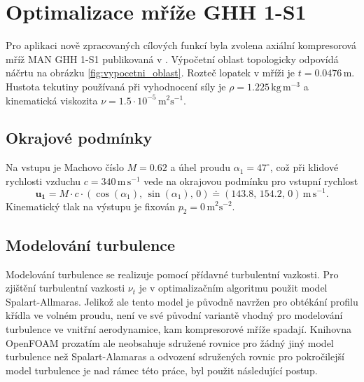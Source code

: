 \section{Optimalizace mříže GHH 1-S1}
Pro aplikaci nově zpracovaných cílových funkcí byla zvolena axiální kompresorová mříž MAN GHH 1-S1 publikovaná v \cite{steinert1990design}.
Výpočetní oblast topologicky odpovídá náčrtu na obrázku \ref{fig:vypocetni_oblast}.
Rozteč lopatek v mříži je $ t=0.0476\,\mathrm{m} $. Hustota tekutiny používaná při vyhodnocení síly je $ \rho=1.225\,\mathrm{kg\,m^{-3}} $ a kinematická viskozita $ \nu = 1.5\cdot10^{-5} \, \mathrm{m^2s^{-1}} $.

\subsection{Okrajové podmínky}  Na vstupu je Machovo číslo $ M=0.62 $ a úhel proudu $ \alpha_1 = 47^\circ $, což při klidové rychlosti vzduchu $ c=340 \,\mathrm{m\,s^{-1}} $ vede na okrajovou podmínku pro vstupní rychlost  
\begin{equation}\label{key}
\mathbf{u_1}=M\cdot c \cdot (\cos(\alpha_1),\, \sin(\alpha_1),\, 0) \doteq (143.8,\, 154.2,\, 0)\, \mathrm{m\,s^{-1}}.
\end{equation}
Kinematický tlak na výstupu je fixován $ p_2=0\,\mathrm{m^2s^{-2}} $.

\subsection{Modelování turbulence}
Modelování turbulence se realizuje pomocí přídavné turbulentní vazkosti. Pro zjištění turbulentní vazkosti $ \nu_t $ je v optimalizačním algoritmu použit model Spalart-Allmaras\cite{spalart1992one}. Jelikož ale tento model je původně navržen pro obtékání profilu křídla ve volném proudu, není ve své původní variantě vhodný pro modelování turbulence ve vnitřní aerodynamice, kam kompresorové mříže spadají. Knihovna OpenFOAM prozatím ale neobsahuje sdružené rovnice pro žádný jiný model turbulence než Spalart-Alamaras a odvození sdružených rovnic pro pokročilejší model turbulence je nad rámec této práce, byl použit následující postup. 

